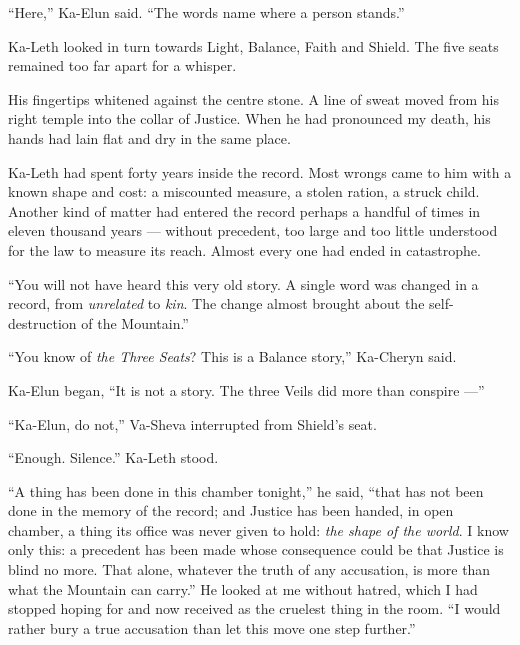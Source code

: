 ``Here,'' Ka-Elun said. ``The words name where a person stands.''\par

Ka-Leth looked in turn towards Light, Balance, Faith and Shield. The five seats remained too far apart for a whisper.\par

His fingertips whitened against the centre stone. A line of sweat moved from his right temple into the collar of Justice. When he had pronounced my death, his hands had lain flat and dry in the same place.\par

Ka-Leth had spent forty years inside the record. Most wrongs came to him with a known shape and cost: a miscounted measure, a stolen ration, a struck child. Another kind of matter had entered the record perhaps a handful of times in eleven thousand years --- without precedent, too large and too little understood for the law to measure its reach. Almost every one had ended in catastrophe.\par

``You will not have heard this very old story. A single word was changed in a record, from \textit{unrelated} to \textit{kin}. The change almost brought about the self-destruction of the Mountain.''\par

``You know of \textit{the Three Seats}? This is a Balance story,'' Ka-Cheryn said.\par

Ka-Elun began, ``It is not a story. The three Veils did more than conspire ---''\par

``Ka-Elun, do not,'' Va-Sheva interrupted from Shield's seat.\par

``Enough. Silence.'' Ka-Leth stood.\par

``A thing has been done in this chamber tonight,'' he said, ``that has not been done in the memory of the record; and Justice has been handed, in open chamber, a thing its office was never given to hold: \textit{the shape of the world}. I know only this: a precedent has been made whose consequence could be that Justice is blind no more. That alone, whatever the truth of any accusation, is more than what the Mountain can carry.'' He looked at me without hatred, which I had stopped hoping for and now received as the cruelest thing in the room. ``I would rather bury a true accusation than let this move one step further.''\par

